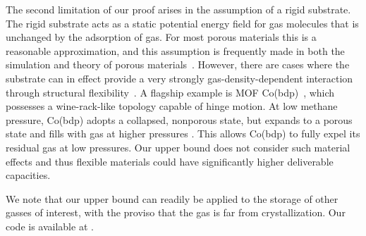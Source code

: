 
The second limitation of our proof arises in the assumption of a rigid substrate. The rigid substrate acts as a static potential energy field for gas molecules that is unchanged by the adsorption of gas.
For most porous materials this is a reasonable approximation, and this assumption is frequently made in both the simulation and theory of porous materials~\cite{witman2017influence}. However, there are cases where the substrate can in effect provide a very strongly gas-density-dependent interaction through structural flexibility~\cite{schneemann2014flexible}. A flagship example is MOF Co(bdp)~\cite{choi2008broadly}, which possesses a wine-rack-like topology capable of hinge motion. At low methane pressure, Co(bdp) adopts a collapsed, nonporous state, but expands to a porous state and fills with gas at higher pressures \cite{mason2015methane}. This allows Co(bdp) to fully expel its residual gas at low pressures.
Our upper bound does not consider such material effects and thus flexible materials could have significantly higher deliverable capacities.

We note that our upper bound can readily be applied to the storage of other gasses of interest, with the proviso that the gas is far from crystallization. Our code is available at .





